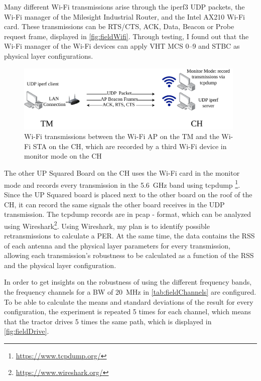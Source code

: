 Many different Wi-Fi transmissions arise through the iperf3 \ac{UDP} packets, the Wi-Fi manager of the Milesight Industrial Router, and the Intel AX210 Wi-Fi card.
These transmissions can be RTS/CTS, ACK, Data, Beacon or Probe request frame, displayed in \autoref{fig:fieldWifi}.
Through testing, I found out that the Wi-Fi manager of the Wi-Fi devices can apply \ac{VHT} \ac{MCS} \numrange{0}{9} and \ac{STBC} as physical layer configurations.

\begin{figure}[H]%
	\centering
	\includegraphics[width=0.98\textwidth]{Latex/figures/FieldExperimentwifi}
	\caption{Wi-Fi transmissions between the Wi-Fi \ac{AP} on the \acf{TM} and the Wi-Fi \ac{STA} on the \acf{CH}, which
	are recorded by a third Wi-Fi device in monitor mode on the \ac{CH}}
	\label{fig:fieldWifi}%
\end{figure}

The other UP Squared Board on the \ac{CH} uses the Wi-Fi card in the monitor mode and records every transmission in the \SI{5.6}{\giga\hertz} band using tcpdump \footnote{\url{https://www.tcpdump.org/}}.
Since the UP Squared board is placed next to the other board on the roof of the \ac{CH}, it can record the same signals the other board receives in the \ac{UDP} transmission.
The tcpdump records are in pcap - format, which can be analyzed using Wireshark\footnote{\url{https://www.wireshark.org/}}.
Using Wireshark, my plan is to identify possible retransmissions to calculate a \ac{PER}.
At the same time, the data contains the \ac{RSS} of each antenna and the physical layer parameters for every
transmission, allowing each transmission's robustness to be calculated as a function of the \ac{RSS} and the physical
layer configuration.

In order to get insights on the robustness of using the different frequency bands, the frequency channels for a \ac{BW} of \SI{20}{\mega\hertz} in \autoref{tab:fieldChannels} are configured.
To be able to calculate the means and standard deviations of the result for every configuration, the experiment is repeated \num{5} times for each channel,
which means that the tractor drives \num{5} times the same path, which is displayed in \autoref{fig:fieldDrive}.

